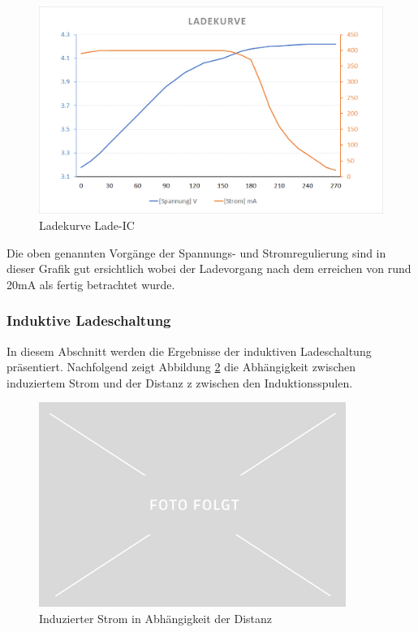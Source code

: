 \begin{figure}[H]
	\begin{center}
		\includegraphics[width=120mm]{data/LadekurveLadeIC.png}
		\caption[Ladekurve Lade-IC]{Ladekurve Lade-IC} %
		\label{fig:LadekurveLadeIC}
	\end{center}
\end{figure}

Die oben genannten Vorgänge der Spannungs- und Stromregulierung sind in dieser Grafik gut ersichtlich wobei der Ladevorgang nach dem erreichen von rund 20mA als fertig betrachtet wurde.

\subsubsection*{Induktive Ladeschaltung}\label{sec:batterie}
In diesem Abschnitt werden die Ergebnisse der induktiven Ladeschaltung präsentiert. Nachfolgend zeigt Abbildung \ref{fig:InduzierterStrom} die Abhängigkeit zwischen induziertem Strom und der Distanz z zwischen den Induktionsspulen.

\begin{figure}[H]
	\begin{center}
		\includegraphics[width=100mm]{data/Platzhalter.jpg}
		\caption[Induzierter Strom in Abhängigkeit der Distanz]{Induzierter Strom in Abhängigkeit der Distanz} %
		\label{fig:InduzierterStrom}
	\end{center}
\end{figure}

